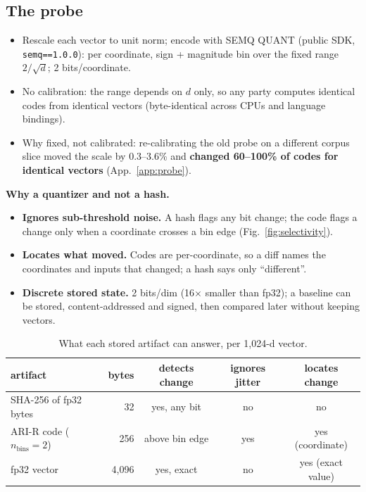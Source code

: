 \documentclass{article}
\begin{document}
\subsection{The probe}
\begin{itemize}
  \item Rescale each vector to unit norm; encode with SEMQ QUANT (public SDK, \texttt{semq==1.0.0}): per coordinate, sign + magnitude bin over the fixed range $2/\sqrt d$; 2 bits/coordinate.
  \item No calibration: the range depends on $d$ only, so any party computes identical codes from identical vectors (byte-identical across CPUs and language bindings).
  \item Why fixed, not calibrated: re-calibrating the old probe on a different corpus slice moved the scale by 0.3--3.6\% and \textbf{changed 60--100\% of codes for identical vectors} (App.~\ref{app:probe}).
\end{itemize}
\textbf{Why a quantizer and not a hash.}
\begin{itemize}
  \item \textbf{Ignores sub-threshold noise.} A hash flags any bit change; the code flags a change only when a coordinate crosses a bin edge (Fig.~\ref{fig:selectivity}).
  \item \textbf{Locates what moved.} Codes are per-coordinate, so a diff names the coordinates and inputs that changed; a hash says only ``different''.
  \item \textbf{Discrete stored state.} 2 bits/dim (16$\times$ smaller than fp32); a baseline can be stored, content-addressed and signed, then compared later without keeping vectors.
\end{itemize}
\begin{table}[h]\centering\footnotesize
\caption{What each stored artifact can answer, per 1{,}024-d vector.}\label{tab:storage}
\begin{tabular}{lrccc}
\toprule
artifact & bytes & detects change & ignores jitter & locates change \\
\midrule
SHA-256 of fp32 bytes & 32 & yes, any bit & no & no \\
ARI-R code ($n_{\text{bins}}{=}2$) & 256 & above bin edge & yes & yes (coordinate) \\
fp32 vector & 4{,}096 & yes, exact & no & yes (exact value) \\
\bottomrule
\end{tabular}
\end{table}
\end{document}
